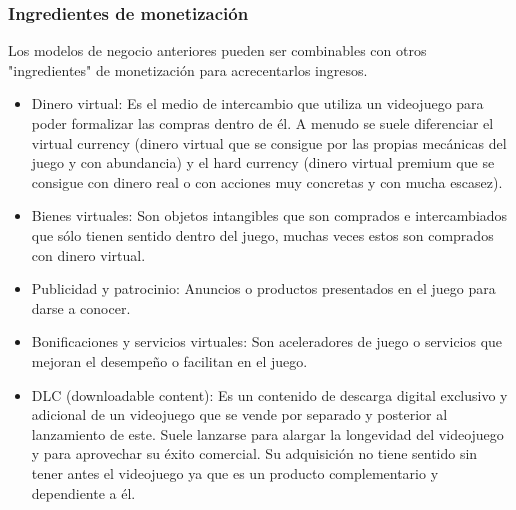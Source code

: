 \begin{table}[htbp]
{\begin{tabular}{llll}
	                           
	\end{tabular}
}
\end{table}



\subsubsection{Ingredientes de monetización}
Los modelos de negocio anteriores pueden ser combinables con otros "ingredientes" de monetización para acrecentarlos ingresos. 
\begin{itemize}
	\item Dinero virtual: Es el medio de intercambio que utiliza un videojuego para poder formalizar las compras dentro de él. A menudo se suele diferenciar el virtual currency (dinero virtual que se consigue por las propias mecánicas del juego y con abundancia) y el hard currency (dinero virtual premium que se consigue con dinero real o con acciones muy concretas y con mucha escasez).
	\item Bienes virtuales: Son objetos intangibles que son comprados e intercambiados que sólo tienen sentido dentro del juego, muchas veces estos son comprados con dinero virtual. 
	\item Publicidad y patrocinio: Anuncios o productos presentados en el juego para darse a conocer.
	\item Bonificaciones y servicios virtuales: Son aceleradores de juego o servicios que mejoran el desempeño o facilitan en el juego.
	\item DLC (downloadable content): Es un contenido de descarga digital exclusivo y adicional de un videojuego que se vende por separado y posterior al lanzamiento de este. Suele lanzarse para alargar la longevidad del videojuego y para aprovechar su éxito comercial. Su adquisición no tiene sentido sin tener antes el videojuego ya que es un producto complementario y dependiente a él.
\end{itemize}
